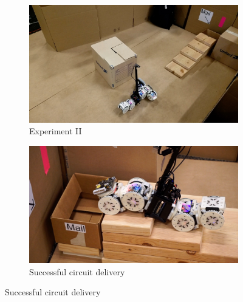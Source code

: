 \documentclass[conference]{IEEEtran}
\begin{document}
\begin{figure}[t]
      \centering
      \begin{subfigure}[t]{0.24\textwidth}
        \includegraphics[width=\textwidth]{images/stairs_explore_overhead.jpg}
        \caption{Experiment II}
    \end{subfigure}
    \begin{subfigure}[t]{0.24\textwidth}
        \includegraphics[width=\textwidth]{images/stairs_climb.jpg}
        \caption{Successful circuit delivery}
    \end{subfigure}
    

\end{figure}
\end{document}

